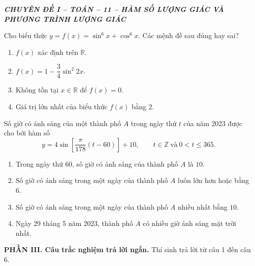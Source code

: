 \documentclass[12pt,a4paper]{article}
\begin{document}
\newpage

\begin{center}
  {\small\bfseries\itshape CHUYÊN ĐỀ I -- TOÁN -- 11 -- HÀM SỐ LƯỢNG GIÁC VÀ PHƯƠNG TRÌNH LƯỢNG GIÁC}
\end{center}

\begin{questions}[resume,itemsep=6pt,topsep=3pt]
  \item Cho biểu thức $y=f(x)=\sin^6x+\cos^6x$. Các mệnh đề sau đúng hay sai?
  \begin{enumerate}[label=\alph*),leftmargin=7mm,labelsep=1mm,itemsep=3pt,topsep=3pt,parsep=0pt]
    \item $f(x)$ xác định trên $\mathbb{R}$.
    \item $f(x)=1-\dfrac{3}{4}\sin^2 2x$.
    \item Không tồn tại $x\in\mathbb{R}$ để $f(x)=0$.
    \item Giá trị lớn nhất của biểu thức $f(x)$ bằng $2$.
  \end{enumerate}

  \item Số giờ có ánh sáng của một thành phố $A$ trong ngày thứ $t$ của năm 2023 được cho bởi hàm số
  \[
    y=4\sin\left[\dfrac{\pi}{178}(t-60)\right]+10,
    \qquad t\in\mathbb{Z}\ \text{và}\ 0<t\le365.
  \]
  \begin{enumerate}[label=\alph*),leftmargin=7mm,labelsep=1mm,itemsep=3pt,topsep=3pt,parsep=0pt]
    \item Trong ngày thứ $60$, số giờ có ánh sáng của thành phố $A$ là $10$.
    \item Số giờ có ánh sáng trong một ngày của thành phố $A$ luôn lớn hơn hoặc bằng $6$.
    \item Số giờ có ánh sáng trong một ngày của thành phố $A$ nhiều nhất bằng $10$.
    \item Ngày 29 tháng 5 năm 2023, thành phố $A$ có nhiều giờ ánh sáng mặt trời nhất.
  \end{enumerate}
\end{questions}

\vspace{3mm}
\textbf{PHẦN III. Câu trắc nghiệm trả lời ngắn.} Thí sinh trả lời từ câu 1 đến câu 6.
\end{document}
